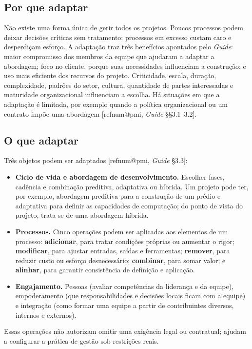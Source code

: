 \documentclass[12pt,a4paper,article,oneside,english,brazil]{abntex2}
\makeatletter
\newcommand{\refnum}[1]{\csname refnum@#1\endcsname}
\makeatother
\begin{document}
\subsection{Por que adaptar}

Não existe uma forma única de gerir todos os projetos. Poucos processos podem deixar decisões críticas sem tratamento; processos em excesso custam caro e desperdiçam esforço. A adaptação traz três benefícios apontados pelo \textit{Guide}: maior compromisso dos membros da equipe que ajudaram a adaptar a abordagem; foco no cliente, porque suas necessidades influenciam a construção; e uso mais eficiente dos recursos do projeto. Criticidade, escala, duração, complexidade, padrões do setor, cultura, quantidade de partes interessadas e maturidade organizacional influenciam a escolha. Há situações em que a adaptação é limitada, por exemplo quando a política organizacional ou um contrato impõe uma abordagem [\refnum{pmi}, \textit{Guide} §§3.1–3.2].
\subsection{O que adaptar}

Três objetos podem ser adaptados [\refnum{pmi}, \textit{Guide} §3.3]:

\begin{itemize}
\item \textbf{Ciclo de vida e abordagem de desenvolvimento.} Escolher fases, cadência e combinação preditiva, adaptativa ou híbrida. Um projeto pode ter, por exemplo, abordagem preditiva para a construção de um prédio e adaptativa para definir as capacidades de computação; do ponto de vista do projeto, trata-se de uma abordagem híbrida.
\item \textbf{Processos.} Cinco operações podem ser aplicadas aos elementos de um processo: \textbf{adicionar}, para tratar condições próprias ou aumentar o rigor; \textbf{modificar}, para ajustar entradas, saídas e ferramentas; \textbf{remover}, para reduzir custo ou esforço desnecessário; \textbf{combinar}, para somar valor; e \textbf{alinhar}, para garantir consistência de definição e aplicação.
\item \textbf{Engajamento.} Pessoas (avaliar competências da liderança e da equipe), empoderamento (que responsabilidades e decisões locais ficam com a equipe) e integração (como formar uma equipe a partir de contribuintes diversos, internos e externos).
\end{itemize}

Essas operações não autorizam omitir uma exigência legal ou contratual; ajudam a configurar a prática de gestão sob restrições reais.
\end{document}
